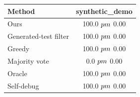 \begin{tabular}{lc}
\toprule
Method & synthetic_demo \\
\midrule
Ours & 100.0 $\\pm$ 0.00 \\
Generated-test filter & 100.0 $\\pm$ 0.00 \\
Greedy & 100.0 $\\pm$ 0.00 \\
Majority vote & 0.0 $\\pm$ 0.00 \\
Oracle & 100.0 $\\pm$ 0.00 \\
Self-debug & 100.0 $\\pm$ 0.00 \\
\bottomrule
\end{tabular}

